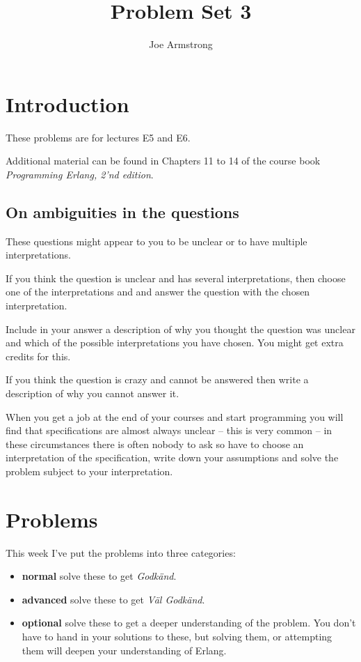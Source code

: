 \documentclass[12pt]{hitec}
\title{Problem Set 3}
\author{Joe Armstrong}
\date{}
\begin{document}
\maketitle

\tableofcontents

\section{Introduction}
These problems are for lectures E5 and E6.

Additional material can be found in Chapters 11 to 14 of the course book
{\sl Programming Erlang, 2'nd edition}.

\subsection*{On ambiguities in the questions}

These questions might appear to you to be unclear or to have multiple
interpretations.

If you think the question is unclear and has several interpretations,
then choose one of the interpretations and and answer the question
with the chosen interpretation.

Include in your answer a description of why you thought the question
was unclear and which of the possible interpretations you have
chosen. You might get extra credits for this.

If you think the question is crazy and cannot be answered then write a
description of why you cannot answer it.

When you get a job at the end of your courses and start programming
you will find that specifications are almost always unclear -- this is very
common -- in these circumstances there is often nobody to ask so have
to choose an interpretation of the specification, write down your
assumptions and solve the problem subject to your interpretation.
 
\section{Problems}

This week I've put the problems into three categories:

\begin{itemize}
\item {\bf normal} solve these to get {\sl Godk\"{a}nd}.
\item {\bf advanced} solve these to get {\sl V\"{a}l Godk\"{a}nd}.
\item {\bf optional} solve these to get a deeper understanding of the problem. You don't
have to hand in your solutions to these, but solving them, or attempting them will
deepen your understanding of Erlang.
\end{itemize}
\end{document}
